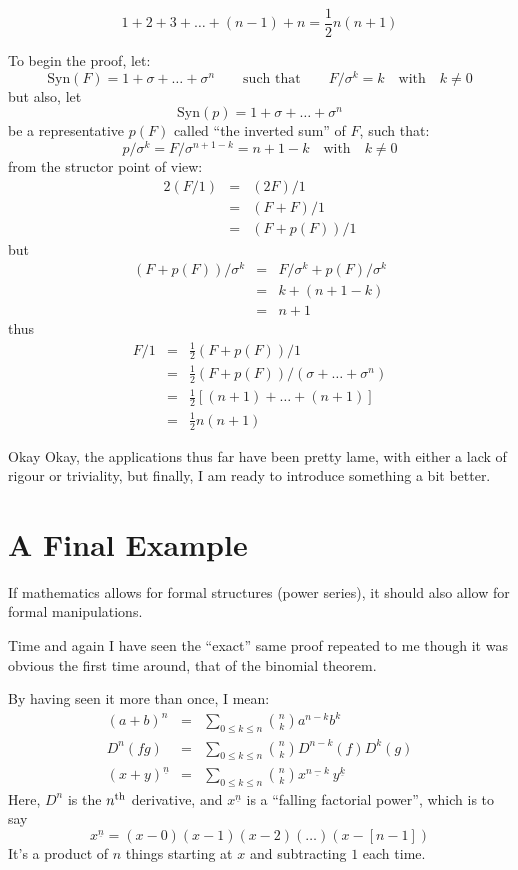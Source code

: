 \documentclass[twoside]{article}
\begin{document}
$$ 1+2+3+\ldots+(n-1)+n=\frac{1}{2}n(n+1) $$

To begin the proof, let:
$$ \mbox{Syn}(F)=1+\sigma+\ldots+\sigma^n\qquad\mbox{such that}\qquad F/\sigma^k=k\quad\mbox{with}\quad k\neq 0 $$
but also, let
$$ \mbox{Syn}(p)=1+\sigma+\ldots+\sigma^n $$
be a representative $ p(F) $ called ``the inverted sum'' of $ F $, such that:
$$ p/\sigma^k=F/\sigma^{n+1-k}=n+1-k\quad\mbox{with}\quad k\neq 0 $$
from the structor point of view:
\begin{eqnarray*}
2(F/1) & = & (2F)/1 \\
 & = & (F+F)/1 \\
 & = & (F+p(F))/1
\end{eqnarray*}
but
\begin{eqnarray*}
(F+p(F))/\sigma^k & = & F/\sigma^k+p(F)/\sigma^k \\
 & = & k+(n+1-k) \\
 & = & n+1
\end{eqnarray*}
thus
\begin{eqnarray*}
F/1 & = & \frac{1}{2}(F+p(F))/1 \\
 & = & \frac{1}{2}(F+p(F))/(\sigma+\ldots+\sigma^n) \\
 & = & \frac{1}{2}[(n+1)+\ldots+(n+1)] \\
 & = & \frac{1}{2} n(n+1)
\end{eqnarray*}

Okay Okay, the applications thus far have been pretty lame, with either a lack of rigour or triviality, but finally,
I am ready to introduce something a bit better.

\section{A Final Example}

If mathematics allows for formal structures (power series), it should also allow for formal manipulations.

Time and again I have seen the ``exact'' same proof repeated to me though it was obvious the first time around,
that of the binomial theorem.

By having seen it more than once, I mean:
\begin{eqnarray}
(a+b)^n & = & \sum_{0\le k\le n}{n \choose k}a^{n-k}b^k \\
D^n(fg) & = & \sum_{0\le k\le n}{n \choose k}D^{n-k}(f)D^k(g) \\
(x+y)^{\underline{n}} & = & \sum_{0\le k\le n}{n \choose k}x^{\underline{n-k}}\ y^{\underline{k}}
\end{eqnarray}
Here, $ D^n $ is the $ n^{\mbox{\scriptsize th}} $ derivative,
and $ x^{\underline{n}} $ is a ``falling factorial power'', which is to say
$$ x^{\underline{n}}=(x-0)(x-1)(x-2)(\ldots)(x-[n-1]) $$
It's a product of $ n $ things starting at $ x $ and subtracting $ 1 $ each time.
\end{document}
